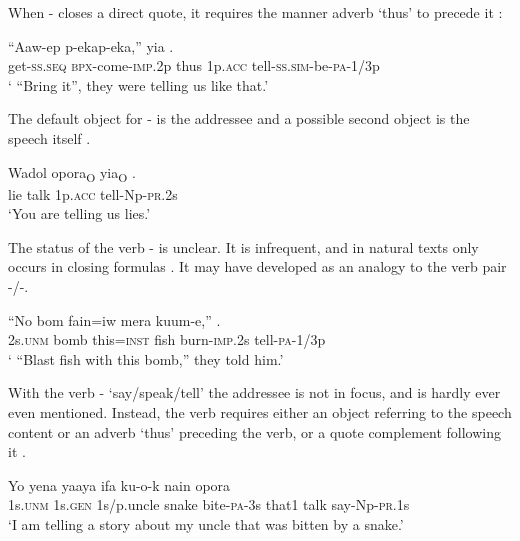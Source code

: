 When - closes a direct quote, it requires the manner adverb  `thus' to precede it :

\ea%
\label{ex:3:x315}
\gll ``Aaw-ep p-ekap-eka,''  yia .\\
get-\textsc{ss}.\textsc{seq} \textsc{bpx}-come-\textsc{imp}.2p thus 1p.\textsc{acc} tell-\textsc{ss}.\textsc{sim}-be-\textsc{pa}-1/3p\\
\glt` ``Bring it'', they were telling us like that.'
\z

The default object for - is the addressee  and a possible second object is the speech itself .

\ea%
\label{ex:3:x316}
\gll {\ob}Wadol opora{\cb}\textsubscript{O} {\ob}yia{\cb}\textsubscript{O} . \\
lie talk 1p.\textsc{acc} tell-Np-\textsc{pr}.2s \\
\glt`You are telling us lies.'
\z

The status of the verb - is unclear. It is infrequent, and in natural texts only occurs in closing formulas . It may have developed as an analogy to the verb pair -/-.

\ea%
\label{ex:3:x317}
\gll ``No bom fain=iw mera kuum-e,'' . \\
2s.\textsc{unm} bomb this=\textsc{inst} fish burn-\textsc{imp}.2s tell-\textsc{pa}-1/3p \\
\glt` ``Blast fish with this bomb,'' they told him.'
\z

With the verb - `say/speak/tell' the addressee is not in focus, and is hardly ever even mentioned. Instead, the verb requires either an object referring to the speech content  or an adverb  `thus'  preceding the verb, or a quote complement following it . 

\ea%
\label{ex:3:x318}
\gll Yo yena yaaya ifa ku-o-k nain opora \\
1s.\textsc{unm} 1s.\textsc{gen} 1s/p.uncle snake bite-\textsc{pa}-3s that1 talk say-Np-\textsc{pr}.1s\\
\glt`I am telling a story about my uncle that was bitten by a snake.'
\z

